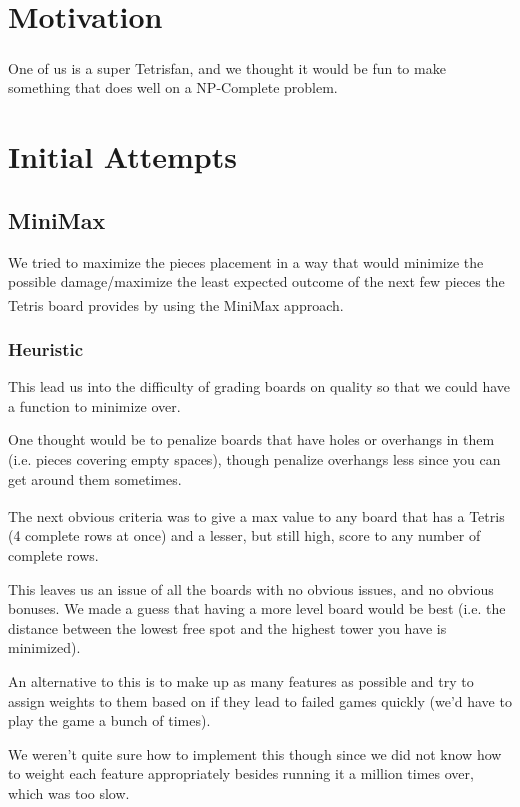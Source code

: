 \documentclass[ fontsize=11pt]{article}
\def\tetris{Tetris\textsuperscript{\textregistered}}
\begin{document}
\section{Motivation}
\label{sec:motivation}
One of us is a super \tetris{}fan, and we thought it would be fun to make something that does well on a NP-Complete problem.


\section{Initial Attempts}
\label{sec:initial_attempts}

\subsection{MiniMax}
\par We tried to maximize the pieces placement in a way that would minimize the possible damage/maximize the least expected outcome of the next few pieces the \tetris{} board provides by using the MiniMax approach.
\subsubsection{Heuristic}
\par This lead us into the difficulty of grading boards on quality so that we could have a function to minimize over.

\par One thought would be to penalize boards that have holes or overhangs in them (i.e. pieces covering empty spaces), though penalize overhangs less since you can get around them sometimes.

\par The next obvious criteria was to give a max value to any board that has a \tetris{} (4 complete rows at once) and a lesser, but still high, score to any number of complete rows.

\par This leaves us an issue of all the boards with no obvious issues, and no obvious bonuses. We made a guess that having a more level board would be best (i.e. the distance between the lowest free spot and the highest tower you have is minimized).

\par An alternative to this is to make up as many features as possible and try to assign weights to them based on if they lead to failed games quickly (we'd have to play the game a bunch of times).

\par We weren't quite sure how to implement this though since we did not know how to weight each feature appropriately besides running it a million times over, which was too slow.
\end{document}
